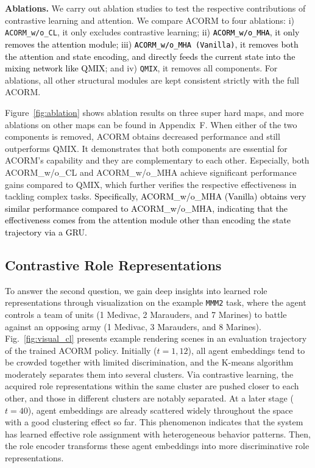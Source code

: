 \documentclass{article} %
\begin{document}
\textbf{Ablations.}
We carry out ablation studies to test the respective contributions of contrastive learning and attention.
We compare ACORM to four ablations: i) \texttt{ACORM\_w/o\_CL}, it only excludes contrastive learning; \textcolor{black}{ii) \texttt{ACORM\_w/o\_MHA}, it only removes the attention module; iii) \texttt{ACORM\_w/o\_MHA (Vanilla)}, it removes both the attention and state encoding, and directly feeds the current state into the mixing network like QMIX}; and iv) \texttt{QMIX}, it removes all components. 
For ablations, all other structural modules are kept consistent strictly with the full ACORM.

Figure~\ref{fig:ablation} shows ablation results on three super hard maps, and more ablations on other maps can be found in Appendix~F.
When either of the two components is removed, ACORM obtains decreased performance and still outperforms QMIX.
It demonstrates that both components are essential for ACORM's capability and they are complementary to each other.
Especially, both ACORM\_w/o\_CL and ACORM\_w/o\_MHA achieve significant performance gains compared to QMIX, which further verifies the respective effectiveness in tackling complex tasks.
\textcolor{black}{Specifically, ACORM\_w/o\_MHA (Vanilla) obtains very similar performance compared to ACORM\_w/o\_MHA, indicating that the effectiveness comes from the attention module other than encoding the state trajectory via a GRU.}





\subsection{Contrastive Role Representations} \label{sec:visualization}
To answer the second question, we gain deep insights into learned role representations through visualization on the example \texttt{MMM2} task, where the agent controls a team of units (1 Medivac, 2 Marauders, and 7 Marines) to battle against an opposing army (1 Medivac, 3 Marauders, and 8 Marines).
Fig.~\ref{fig:visual_cl} presents example rendering scenes in an evaluation trajectory of the trained ACORM policy.
Initially ($t\!=\!1, 12$), all agent embeddings tend to be crowded together with limited discrimination, and the K-means algorithm moderately separates them into several clusters.
Via contrastive learning, the acquired role representations within the same cluster are pushed closer to each other, and those in different clusters are notably separated.
At a later stage ($t\!=\!40$), agent embeddings are already scattered widely throughout the space with a good clustering effect so far.
This phenomenon indicates that the system has learned effective role assignment with heterogeneous behavior patterns.
Then, the role encoder transforms these agent embeddings into more discriminative role representations.
\end{document}
